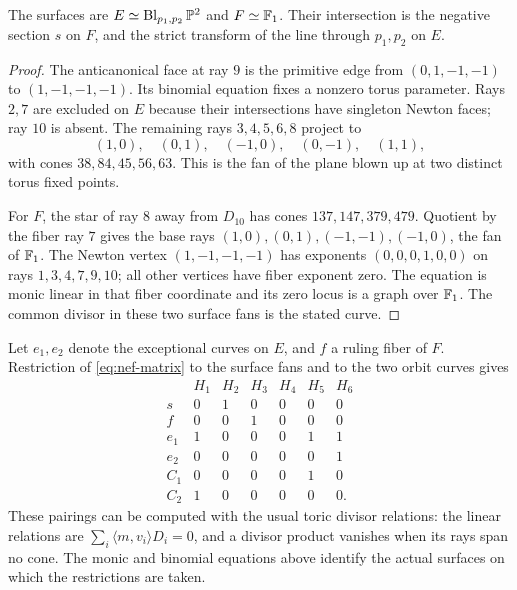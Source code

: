\begin{lemma}\label{lem:surfaces}
The surfaces are $E\simeq\operatorname{Bl}_{p_1,p_2}\mathbb P^2$ and $F\simeq\mathbb F_1$.
Their intersection is the negative section $s$ on $F$, and the
strict transform of the line through $p_1,p_2$ on $E$.
\end{lemma}
\begin{proof}
The anticanonical face at ray $9$ is the primitive edge from
$(0,1,-1,-1)$ to $(1,-1,-1,-1)$. Its binomial equation fixes a
nonzero torus parameter. Rays $2,7$ are excluded on $E$ because
their intersections have singleton Newton faces; ray $10$ is absent.
The remaining rays $3,4,5,6,8$ project to
\[
 (1,0),\quad(0,1),\quad(-1,0),\quad(0,-1),\quad(1,1),
\]
with cones $38,84,45,56,63$. This is the fan of the plane blown
up at two distinct torus fixed points.

For $F$, the star of ray $8$ away from $D_{10}$ has cones
$137,147,379,479$. Quotient by the fiber ray $7$ gives the base
rays $(1,0),(0,1),(-1,-1),(-1,0)$, the fan of $\mathbb F_1$.
The Newton vertex $(1,-1,-1,-1)$ has exponents
$(0,0,0,1,0,0)$ on rays $1,3,4,7,9,10$; all other vertices
have fiber exponent zero. The equation is monic linear in that
fiber coordinate and its zero locus is a graph over $\mathbb F_1$.
The common divisor in these two surface fans is the stated curve.
\end{proof}

Let $e_1,e_2$ denote the exceptional curves on $E$, and $f$ a
ruling fiber of $F$. Restriction of \eqref{eq:nef-matrix} to the
surface fans and to the two orbit curves gives
\begin{equation}\label{eq:degrees}
\begin{array}{c|rrrrrr}
 &H_1&H_2&H_3&H_4&H_5&H_6\\\hline
 s&0&1&0&0&0&0\\
 f&0&0&1&0&0&0\\
 e_1&1&0&0&0&1&1\\
 e_2&0&0&0&0&0&1\\
 C_1&0&0&0&0&1&0\\
 C_2&1&0&0&0&0&0.
\end{array}
\end{equation}
These pairings can be computed with the usual toric divisor
relations: the linear relations are
$\sum_i\langle m,v_i\rangle D_i=0$, and a divisor product vanishes
when its rays span no cone. The monic and binomial equations above
identify the actual surfaces on which the restrictions are taken.

